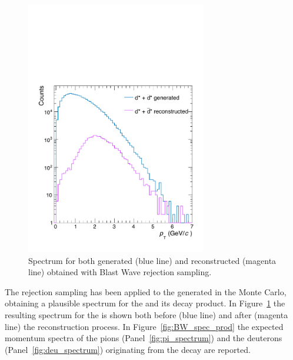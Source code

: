 \begin{figure} [htb]
    \centering
    \includegraphics[width=0.7\textwidth]{gfx/genrecBW}
	\caption{Spectrum for both generated (blue line) and reconstructed (magenta line) \ds obtained with Blast Wave rejection sampling.}
	\label{fig:bw_spectrum}
\end{figure}

The rejection sampling has been applied to the \ds generated in the Monte Carlo, obtaining a 
plausible \pt spectrum for the \ds and its decay product. In Figure~\ref{fig:bw_spectrum} the
resulting \pt spectrum for the \ds is shown both before (blue line) and after (magenta line) the
reconstruction process. 
In Figure~\ref{fig:BW_spec_prod} the expected momentum spectra of the pions 
(Panel~\ref{fig:pi_spectrum}) and the deuterons (Panel~\ref{fig:deu_spectrum}) originating from
the \ds decay are reported.

